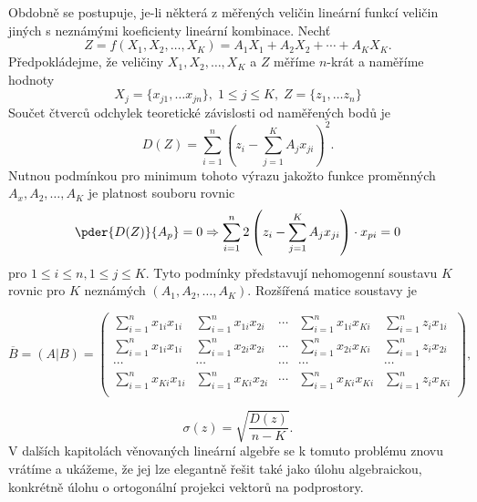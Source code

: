       Obdobně se postupuje, je-li některá z měřených veličin lineární funkcí veličin jiných s 
      neznámými koeficienty lineární kombinace. Nechť
      \begin{equation*}
        Z = f(X_1, X_2, \ldots, X_K) = A_1X_1 + A_2X_2 + \cdots + A_KX_K.
      \end{equation*}
      Předpokládejme, že veličiny \(X_1, X_2, \ldots, X_K\) a \(Z\) měříme \(n\)-krát a naměříme 
      hodnoty
      \begin{equation*}
        X_j = \lbrace x_{j1}, \ldots x_{jn} \rbrace, \; 1 \leq j \leq K, \; 
        Z = \lbrace z_{1}, \ldots z_{n} \rbrace
      \end{equation*}
      Součet čtverců odchylek teoretické závislosti od naměřených bodů je
      \begin{equation*}
        D(Z) = \sum_{i=1}^{n}\left(z_i - \sum_{j=1}^{K}A_jx_{ji}\right)^2.
      \end{equation*}
      Nutnou podmínkou pro minimum tohoto výrazu jakožto funkce proměnných \(A_x, A_2, \ldots, A_K\)
      je platnost souboru rovnic
      \begin{equation*}
        \pder{D(Z)}{A_p} = 0 \Rightarrow 
        \sum_{i=1}^{n}2\left(z_i - \sum_{j=1}^{K}A_jx_{ji}\right)\cdot x_{pi} = 0
      \end{equation*}
      pro \(1 \leq i \leq n, 1 \leq j \leq K\). Tyto podmínky představují nehomogenní soustavu 
      \(K\) rovnic pro \(K\) neznámých \(( A_1, A_2, \ldots, A_K)\). Rozšířená matice soustavy je
      \begin{strip}
      \begin{equation*}
        \overline{B} = (A\lvert B) = 
          \left(
            \begin{array}{cccc|c}
              \sum_{i=1}^{n}x_{1i}x_{1i} & \sum_{i=1}^{n}x_{1i}x_{2i} & \cdots & 
              \sum_{i=1}^{n}x_{1i}x_{Ki} & \sum_{i=1}^{n}z_{i}x_{1i}                    \\
              \sum_{i=1}^{n}x_{1i}x_{1i} & \sum_{i=1}^{n}x_{2i}x_{2i} & \cdots & 
              \sum_{i=1}^{n}x_{2i}x_{Ki} & \sum_{i=1}^{n}z_{i}x_{2i}                    \\
                        \cdots           & \cdots & \cdots & \cdots   & \cdots          \\
              \sum_{i=1}^{n}x_{Ki}x_{1i} & \sum_{i=1}^{n}x_{Ki}x_{2i} & \cdots & 
              \sum_{i=1}^{n}x_{Ki}x_{Ki} & \sum_{i=1}^{n}z_{i}x_{Ki}                    \\
            \end{array}
          \right),
      \end{equation*}
      \end{strip}
      \begin{equation*}
        \sigma(z) = \sqrt{\dfrac{D(z)}{n - K}}.
      \end{equation*}
      V dalších kapitolách věnovaných lineární algebře se k tomuto problému znovu vrátíme a ukážeme,
      že jej lze elegantně řešit také jako úlohu algebraickou, konkrétně úlohu o ortogonální
      projekci vektorů na podprostory.
      
